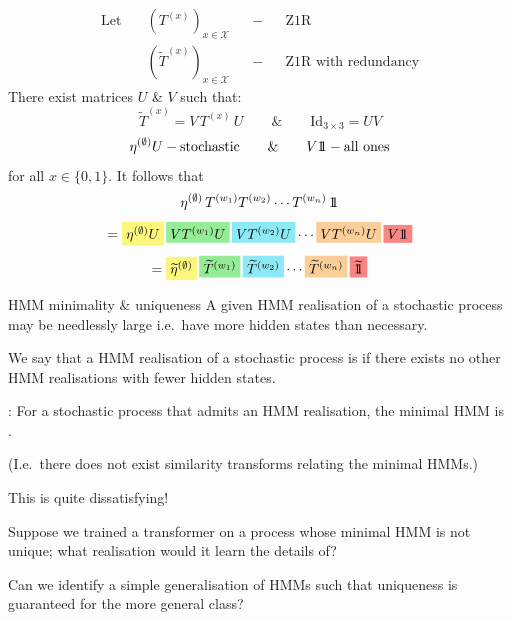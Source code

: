 \documentclass[aspectratio=169,11pt]{beamer}
\newcommand{\uw}[1]{\underline{\smash{#1}}}
\newcommand{\py}[1]{\colorbox{hly}{\ensuremath{#1}}}
\newcommand{\pg}[1]{\colorbox{hlg}{\ensuremath{#1}}}
\newcommand{\pc}[1]{\colorbox{hlc}{\ensuremath{#1}}}
\newcommand{\po}[1]{\colorbox{hlo}{\ensuremath{#1}}}
\newcommand{\pr}[1]{\colorbox{hlr}{\ensuremath{#1}}}
\newcommand{\ones}{\ensuremath{\mathrm{1}\mkern-6mu\mathrm{1}}}
\begin{document}
\begin{frame}
  \vspace{0.5em}
  \[
    \begin{aligned}
      \text{Let}\quad & (T^{(x)})_{x\in\mathcal{X}} && - && \text{Z1R}\\
                      & (\widetilde{T}^{(x)})_{x\in\mathcal{X}} && - && \text{Z1R with redundancy}
    \end{aligned}
  \]
  There exist matrices $U$ \& $V$ such that:
  \[
    \widetilde{T}^{(x)} = V\,T^{(x)}\,U
    \qquad\&\qquad
    \mathrm{Id}_{3\times3} = UV
  \]
  \[
    \eta^{(\emptyset)}U - \text{stochastic}
    \qquad\&\qquad
    V\ones - \text{all ones}
  \]
  for all $x \in \{0,1\}$. It follows that
  \[
    \eta^{(\emptyset)}\,T^{(w_1)}T^{(w_2)}\cdots T^{(w_n)}\,\ones
  \]
  \vspace{-1.0em}
  \[
    = \py{\eta^{(\emptyset)}U}\,
      \pg{V T^{(w_1)} U}\,
      \pc{V T^{(w_2)} U} \cdots
      \po{V T^{(w_n)} U}\,
      \pr{V\ones}
  \]
  \vspace{-1.0em}
  \[
    = \py{\widetilde{\eta}^{(\emptyset)}}\,
      \pg{\widetilde{T}^{(w_1)}}\,
      \pc{\widetilde{T}^{(w_2)}} \cdots
      \po{\widetilde{T}^{(w_n)}}\,
      \pr{\widetilde{\ones}}
  \]
\end{frame}

\begin{frame}{HMM minimality \& uniqueness}
  \vspace{0.3em}
  A given HMM realisation of a stochastic process may be needlessly large
  i.e.\ have more hidden states than necessary.
  \vspace{1em}

  We say that a HMM realisation of a stochastic process is \uw{minimal} if
  there exists no other HMM realisations with fewer hidden states.
  \begin{center}
    \scalebox{0.92}{\figMinimality}
  \end{center}
\end{frame}

\begin{frame}
  \vspace{0.5em}
  \uw{Claim}: For a stochastic process that admits an HMM realisation, the
  minimal HMM is \uw{not unique}.
  \vspace{0.8em}

  (I.e.\ there does not exist similarity transforms relating the minimal HMMs.)
  \vspace{0.8em}

  This is quite dissatisfying!
  \vspace{0.8em}

  Suppose we trained a transformer on a process whose minimal HMM is not
  unique; what realisation would it learn the details of?
  \vspace{1.2em}

  Can we identify a simple generalisation of HMMs such that uniqueness is
  guaranteed for the more general class?
\end{frame}
\end{document}
